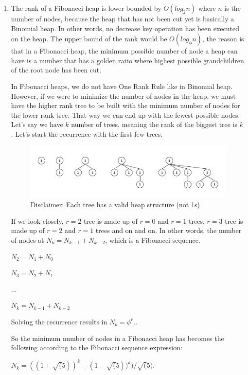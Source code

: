 \documentclass{article}
\begin{document}
\begin{enumerate}
  \item The rank of a Fibonacci heap is lower bounded by $O(log_2n)$ where $n$ is the number of nodes, because the heap that has not been cut yet is basically a Binomial heap. In other words, no decrease key operation has been executed on the heap.
  The upper bound of the rank would be $O(log_{\phi}n)$, the reason is that in a Fibonacci heap, the minimum possible number of node a heap can have is a number that has a golden ratio where highest possible grandchildren of the root node has been cut.
  
  In Fibonacci heaps, we do not have One Rank Rule like in Binomial heap. However, if we were to minimize the number of nodes in the
  heap, we must have the higher rank tree to be built with the minimum number of nodes for the lower rank tree. That way we can end up with the fewest possible nodes.
  Let's say we have $k$ number of trees, meaning the rank of the biggest tree is $k$. Let's start the recurrence with the first few trees.

  \begin{figure}[H]
    \includegraphics[width=\textwidth]{image1.png}
    \caption{Disclaimer: Each tree has a valid heap structure (not 1s)}
    \centering
  \end{figure}

  If we look closely, $r=2$ tree is made up of $r=0$ and $r=1$ trees, $r=3$ tree is made up of $r=2$ and $r=1$ trees and on and on.
  In other words, the number of nodes at $N_k=N_{k-1}+N_{k-2}$, which is a Fibonacci sequence.

  $N_2=N_1+N_0$

  $N_3=N_2+N_1$
  
  $...$

  $N_k=N_{k-1}+N_{k-2}$

  Solving the recurrence results in $N_k=\phi^r$.\cite{master}.
  
  So the minimum number of nodes in a Fibonacci heap has becomes the following according to the Fibonacci sequence expression\cite{wiki}:
  
  $N_k=((1+\sqrt(5))^k-(1-\sqrt(5))^k)/\sqrt(5).$


\end{enumerate}
\end{document}
